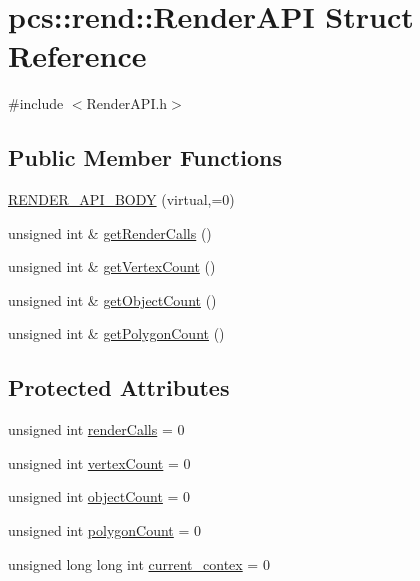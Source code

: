 \hypertarget{structpcs_1_1rend_1_1RenderAPI}{}\section{pcs\+:\+:rend\+:\+:Render\+A\+PI Struct Reference}
\label{structpcs_1_1rend_1_1RenderAPI}


{\ttfamily \#include $<$Render\+A\+P\+I.\+h$>$}

\subsection*{Public Member Functions}
\begin{DoxyCompactItemize}
\item 
\hyperlink{structpcs_1_1rend_1_1RenderAPI_a34075e364e4206de2d211f6b5657a799}{R\+E\+N\+D\+E\+R\+\_\+\+A\+P\+I\+\_\+\+B\+O\+DY} (virtual,=0)
\item 
unsigned int \& \hyperlink{structpcs_1_1rend_1_1RenderAPI_a34f9be7996f3f53cc46e4cb026948f79}{get\+Render\+Calls} ()
\item 
unsigned int \& \hyperlink{structpcs_1_1rend_1_1RenderAPI_a38d5d7368f8ae3eeb697a7f445e0e3ff}{get\+Vertex\+Count} ()
\item 
unsigned int \& \hyperlink{structpcs_1_1rend_1_1RenderAPI_a404f63a757521ea5e9266ad88aa11f56}{get\+Object\+Count} ()
\item 
unsigned int \& \hyperlink{structpcs_1_1rend_1_1RenderAPI_a008e9398cd7e1fb604e394c3fcf4ef39}{get\+Polygon\+Count} ()
\end{DoxyCompactItemize}
\subsection*{Protected Attributes}
\begin{DoxyCompactItemize}
\item 
unsigned int \hyperlink{structpcs_1_1rend_1_1RenderAPI_a7d62825c152d2818b298bd2dfbacb067}{render\+Calls} = 0
\item 
unsigned int \hyperlink{structpcs_1_1rend_1_1RenderAPI_a7f970d9c771a1545dc7cc4dc8cd9a257}{vertex\+Count} = 0
\item 
unsigned int \hyperlink{structpcs_1_1rend_1_1RenderAPI_a4bbd21712e5f5220e6a7a8778ddc8c1d}{object\+Count} = 0
\item 
unsigned int \hyperlink{structpcs_1_1rend_1_1RenderAPI_a5b46b163e34029c481d9bce795524d78}{polygon\+Count} = 0
\item 
unsigned long long int \hyperlink{structpcs_1_1rend_1_1RenderAPI_aa86af46699d4e430806d1033c387e17f}{current\+\_\+contex} = 0
\end{DoxyCompactItemize}



